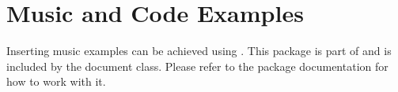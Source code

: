 \documentclass[openLilyLib_CG]{subfiles}
\begin{document}
\section{Music and Code Examples}
Inserting music examples can be achieved using .
This package is part of \openlilylib{} and is included by the document class.
Please refer to the package documentation for how to work with it.

\end{document}
